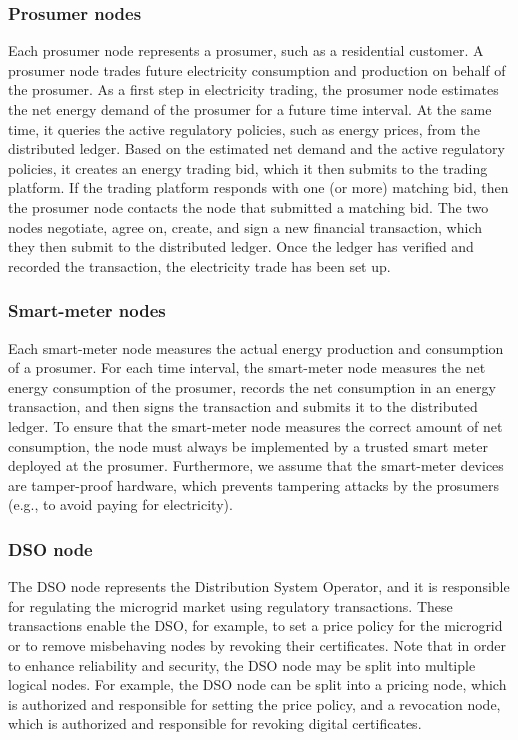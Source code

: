 \documentclass[chi_draft]{sigchi}
\begin{document}
\subsubsection{Prosumer nodes}
Each prosumer node represents a prosumer, such as a residential customer.
A prosumer node trades future electricity consumption and production on behalf of the prosumer.
As a first step in electricity trading, the prosumer node estimates the net energy demand of the prosumer for a future time interval.
At the same time, it queries the active regulatory policies, such as energy prices, from the distributed ledger.
Based on the estimated net demand and the active regulatory policies, it creates an energy trading bid, which it then submits to the trading platform.
If the trading platform responds with one (or more) matching bid, then the prosumer node contacts the node that submitted a matching bid.
The two nodes negotiate, agree on, create, and sign a new financial transaction, which they then submit to the distributed ledger.
Once the ledger has verified and recorded the transaction, the electricity trade has been set up.

\subsubsection{Smart-meter nodes}
Each smart-meter node measures the actual energy production and consumption of a prosumer.
For each time interval, the smart-meter node measures the net energy consumption of the prosumer, records the net consumption in an energy transaction, and then signs the transaction and submits it to the distributed ledger.
To ensure that the smart-meter node measures the correct amount of net consumption, the node must always be implemented by a trusted smart meter deployed at the prosumer.
Furthermore, we assume that the smart-meter devices are tamper-proof hardware, which prevents tampering attacks by the prosumers (e.g., to avoid paying for electricity).

\subsubsection{DSO node}
The DSO node represents the Distribution System Operator, and it is responsible for regulating the microgrid market using regulatory transactions.
These transactions enable the DSO, for example, to set a price policy for the microgrid or to remove misbehaving nodes by revoking their certificates.
Note that in order to enhance reliability and security, the DSO node may be split into multiple logical nodes.
For example, the DSO node can be split into a pricing node, which is authorized and responsible for setting the price policy, and a revocation node, which is authorized and responsible for revoking digital certificates.
\end{document}
